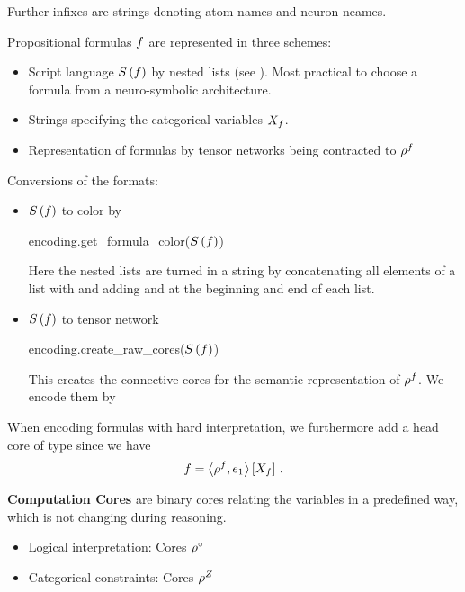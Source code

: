 Further infixes are strings denoting atom names and neuron neames.



Propositional formulas $f$ are represented in three schemes:
\begin{itemize}
	\item Script language $S\left(f\right)$ by nested lists (see ).
		Most practical to choose a formula from a neuro-symbolic architecture.
	\item Strings specifying the categorical variables $X_{f}$.
	\item Representation of formulas by tensor networks being contracted to $\rho^{f}$
\end{itemize}

Conversions of the formats:
\begin{itemize}
	\item $S\left(f\right)$ to color by
		\begin{centeredcode} 
			encoding.get\_formula\_color($S\left(f\right)$)
		\end{centeredcode}
		Here the nested lists are turned in a string by concatenating all elements of a list with \stringof{\_} and adding \stringof{[} and \stringof{]} at the beginning and end of each list.
	\item  $S\left(f\right)$ to tensor network 
		\begin{centeredcode}
			encoding.create\_raw\_cores($S\left(f\right)$)
		\end{centeredcode}
		This creates the connective cores for the semantic representation of $\rho^{f}$.
We encode them by
\end{itemize}

When encoding formulas with hard interpretation, we furthermore add a head core of type  since we have
 	\[ {f} = \left\langle \rho^{f},e_1\right\rangle \left[ X_{f} \right] \, . \]




\textbf{Computation Cores} are binary cores relating the variables in a predefined way, which is not changing during reasoning.
\begin{itemize}
	\item Logical interpretation: Cores $\rho^{\circ}$ 
	\item Categorical constraints: Cores $\rho^{Z}$
\end{itemize}

